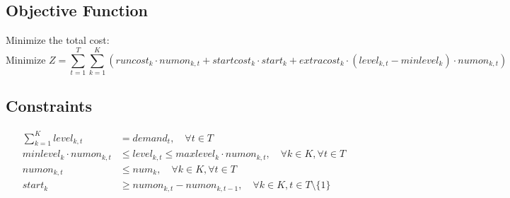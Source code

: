 \documentclass{article}
\begin{document}
\subsection*{Objective Function}
Minimize the total cost:
\[
\text{Minimize } Z = \sum_{t=1}^{T} \sum_{k=1}^{K} \left( runcost_k \cdot numon_{k,t} + startcost_k \cdot start_k + extracost_k \cdot (level_{k,t} - minlevel_k) \cdot numon_{k,t} \right)
\]

\subsection*{Constraints}
\begin{align}
  \sum_{k=1}^{K} level_{k,t} & = demand_t, \quad \forall t \in T \tag{Demand Constraint} \\
  minlevel_k \cdot numon_{k,t} & \leq level_{k,t} \leq maxlevel_k \cdot numon_{k,t}, \quad \forall k \in K, \forall t \in T \tag{Generator Operating Levels} \\
  numon_{k,t} & \leq num_k, \quad \forall k \in K, \forall t \in T \tag{Availability of Generators} \\
  start_k & \geq numon_{k,t} - numon_{k,t-1}, \quad \forall k \in K, t \in T \setminus \{1\} \tag{Startup Constraint}
\end{align}
\end{document}
